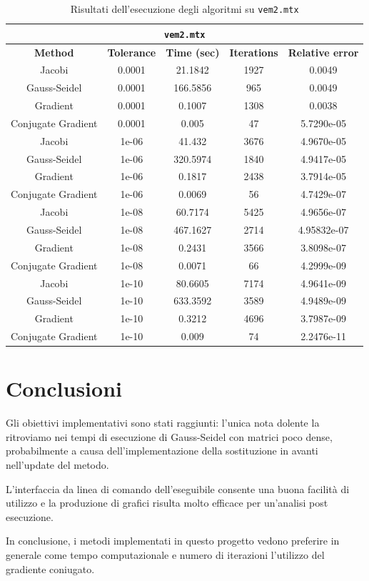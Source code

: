 \documentclass[12pt]{article}
\begin{document}
\begin{table}[!ht]
    \centering
    \begin{tabular}{ccccc}
    \toprule
    \multicolumn{5}{c}{\texttt{vem2.mtx}}\\
    \midrule
        \textbf{Method} & \textbf{Tolerance} & \textbf{Time (sec)} & \textbf{Iterations} & \textbf{Relative error} \\ \midrule
        Jacobi & 0.0001 & 21.1842 & 1927 & 0.0049 \\ 
        Gauss-Seidel & 0.0001 & 166.5856 & 965 & 0.0049 \\ 
        Gradient & 0.0001 & 0.1007 & 1308 & 0.0038 \\ 
        Conjugate Gradient & 0.0001 & 0.005 & 47 & 5.7290e-05 \\ \midrule
        Jacobi & 1e-06 & 41.432 & 3676 & 4.9670e-05 \\ 
        Gauss-Seidel & 1e-06 & 320.5974 & 1840 & 4.9417e-05 \\ 
        Gradient & 1e-06 & 0.1817 & 2438 & 3.7914e-05 \\ 
        Conjugate Gradient & 1e-06 & 0.0069 & 56 & 4.7429e-07 \\ \midrule
        Jacobi & 1e-08 & 60.7174 & 5425 & 4.9656e-07 \\ 
        Gauss-Seidel & 1e-08 & 467.1627 & 2714 & 4.95832e-07 \\ 
        Gradient & 1e-08 & 0.2431 & 3566 & 3.8098e-07 \\ 
        Conjugate Gradient & 1e-08 & 0.0071 & 66 & 4.2999e-09 \\ \midrule
        Jacobi & 1e-10 & 80.6605 & 7174 & 4.9641e-09 \\ 
        Gauss-Seidel & 1e-10 & 633.3592 & 3589 & 4.9489e-09 \\ 
        Gradient & 1e-10 & 0.3212 & 4696 & 3.7987e-09 \\ 
        Conjugate Gradient & 1e-10 & 0.009 & 74 & 2.2476e-11 \\   \bottomrule
    \end{tabular}
    \caption{Risultati dell'esecuzione degli algoritmi su \texttt{vem2.mtx}}
    \label{table:vem2-stats}
\end{table}

\section{Conclusioni}

Gli obiettivi implementativi sono stati raggiunti: l'unica nota dolente la ritroviamo nei tempi di esecuzione di Gauss-Seidel con matrici poco dense, probabilmente a causa dell'implementazione della sostituzione in avanti nell'update del metodo.

L'interfaccia da linea di comando dell'eseguibile consente una buona facilità di utilizzo e la produzione di grafici risulta molto efficace per un'analisi post esecuzione.

In conclusione, i metodi implementati in questo progetto vedono preferire in generale come tempo computazionale e numero di iterazioni l'utilizzo del gradiente coniugato.
\end{document}
